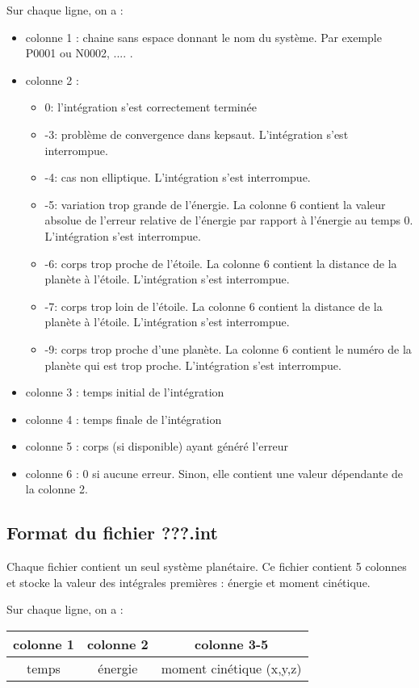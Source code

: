 \documentclass[11pt]{article}
\begin{document}
Sur chaque ligne, on a :
\begin{itemize}
\item colonne 1 : chaine sans espace donnant le nom du syst\`eme. Par exemple P0001 ou N0002, .... .
\item colonne 2 : 
\begin{itemize}
\item 0: l'int\'egration s'est correctement termin\'ee
\item -3: probl\`eme de convergence dans kepsaut. L'int\'egration s'est interrompue.
\item -4: cas non elliptique.  L'int\'egration s'est interrompue.
\item -5: variation trop grande de l'énergie.  La colonne 6 contient la valeur absolue de l'erreur relative de l'énergie par rapport \`a l'énergie au temps 0. L'int\'egration s'est interrompue.
\item -6: corps trop proche de l'\'etoile.  La colonne 6 contient la distance de la plan\`ete \`a l'\'etoile. L'int\'egration s'est interrompue.
\item -7: corps trop loin de l'\'etoile.  La colonne 6 contient la distance de la plan\`ete \`a l'\'etoile. L'int\'egration s'est interrompue.
\item -9: corps trop proche d'une plan\`ete.  La colonne 6 contient le num\'ero de la plan\`ete qui est trop proche. L'int\'egration s'est interrompue.
\end{itemize}
\item colonne 3 : temps initial de l'int\'egration
\item colonne 4 : temps finale de l'int\'egration
\item colonne 5 : corps (si disponible) ayant g\'en\'er\'e l'erreur
\item colonne 6 : 0 si aucune erreur. Sinon, elle contient une valeur d\'ependante de la colonne 2.
\end{itemize}


\subsection{Format du fichier {\bf ???.int} }

Chaque fichier contient un seul syst\`eme plan\'etaire.
Ce fichier contient 5 colonnes et stocke la valeur des int\'egrales premi\`eres  : \'energie et moment cin\'etique.

Sur chaque ligne, on a : 

\begin{tabular}{|c|c|c|} \hline
colonne 1 &  colonne 2 & colonne 3-5 \\ \hline
temps & \'energie & moment cin\'etique (x,y,z)\\    \hline
\end{tabular}
\end{document}
